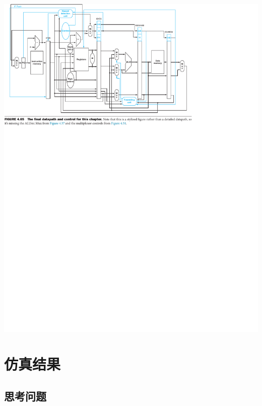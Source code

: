 \documentclass[a4paper,UTF8]{ctexart}
\providecommand{\code}[2]{}
\begin{document}
\includegraphics[width=\textwidth]{FINAL.pdf}

\begin{multicols}{2}
    \code{Top.v}{verilog}
\end{multicols}

\section{仿真结果}

\subsection{思考问题}
\end{document}
